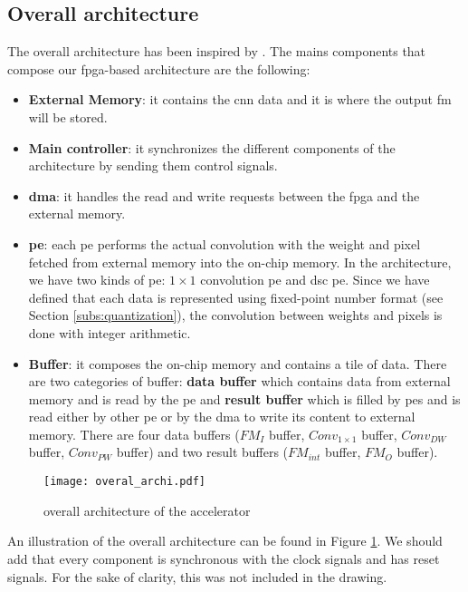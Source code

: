 \subsection{Overall architecture} \label{subsec:overal}
%
The overall architecture has been inspired by \textcite{zhu_efficient_2020}. The mains components that compose our \acrshort{fpga}-based architecture are the following:
%
\begin{itemize}
    \item \textbf{External Memory}: it contains the \acrshort{cnn} data and it is where the output \acrshort{fm} will be stored.
    \item \textbf{Main controller}: it synchronizes the different components of the architecture by sending them control signals.
    \item \textbf{\acrfull{dma}}: it handles the read and write requests between the \acrshort{fpga} and the external memory.
    \item \textbf{\acrshort{pe}}: each \acrshort{pe} performs the actual convolution with the weight and pixel fetched from external memory into the on-chip memory. In the architecture, we have two kinds of \acrshort{pe}: $1 \times 1$ convolution \acrshort{pe} and \acrshort{dsc} \acrshort{pe}. Since we have defined that each data is represented using fixed-point number format (see Section \ref{subs:quantization}), the convolution between weights and pixels is done with integer arithmetic.
    \item \textbf{Buffer}: it composes the on-chip memory and contains a tile of data. There are two categories of buffer: \textbf{data buffer} which contains data from external memory and is read by the \acrshort{pe} and \textbf{result buffer} which is filled by \acrshort{pe}s and is read either by other \acrshort{pe} or by the \acrshort{dma} to write its content to external memory. There are four data buffers ($FM_{I}$ buffer, $Conv_{1 \times 1}$ buffer, $Conv_{DW}$ buffer, $Conv_{PW}$ buffer) and two result buffers ($FM_{int}$ buffer, $FM_{O}$ buffer).
\end{itemize}
%
\begin{figure}
    \centering
    \texttt{[image: overal\_archi.pdf]}
    \caption{overall architecture of the accelerator}
    \label{fig:overal_archi}
\end{figure}
%
An illustration of the overall architecture can be found in Figure \ref{fig:overal_archi}. We should add that every component is synchronous with the clock signals and has reset signals. For the sake of clarity, this was not included in the drawing.

